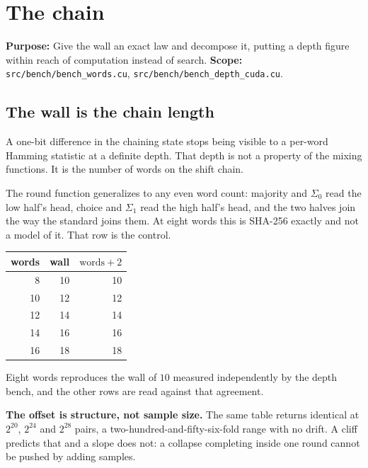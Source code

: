 \chapter{The chain}

\textbf{Purpose:} Give the wall an exact law and decompose it, putting a depth figure within reach of computation instead of search. \textbf{Scope:} \texttt{src/\allowbreak{}bench/\allowbreak{}bench\_\allowbreak{}words.\allowbreak{}cu}, \texttt{src/\allowbreak{}bench/\allowbreak{}bench\_\allowbreak{}depth\_\allowbreak{}cuda.\allowbreak{}cu}.

\section{The wall is the chain length}

A one-bit difference in the chaining state stops being visible to a per-word Hamming statistic at a definite depth. That depth is not a property of the mixing functions. It is the number of words on the shift chain.

The round function generalizes to any even word count: majority and \(\Sigma_0\) read the low half's head, choice and \(\Sigma_1\) read the high half's head, and the two halves join the way the standard joins them. At eight words this is SHA-256 exactly and not a model of it. That row is the control.

\begin{center}
\begin{tabular}{rrr}
\toprule
words & wall & \(\text{words} + 2\) \\
\midrule
8 & 10 & 10 \\
10 & 12 & 12 \\
12 & 14 & 14 \\
14 & 16 & 16 \\
16 & 18 & 18 \\
\bottomrule
\end{tabular}
\end{center}

Eight words reproduces the wall of \(10\) measured independently by the depth bench, and the other rows are read against that agreement.

\textbf{The offset is structure, not sample size.} The same table returns identical at \(2^{20}\), \(2^{24}\) and \(2^{28}\) pairs, a two-hundred-and-fifty-six-fold range with no drift. A cliff predicts that and a slope does not: a collapse completing inside one round cannot be pushed by adding samples.

